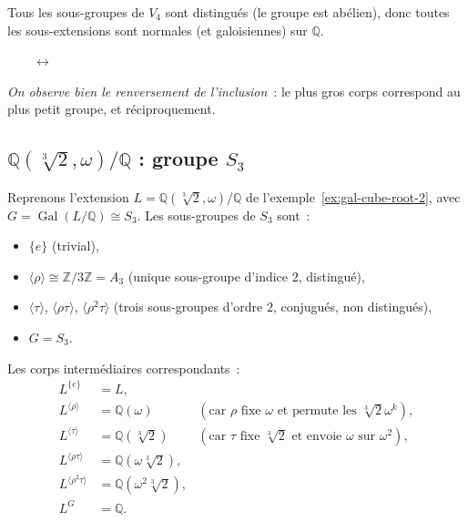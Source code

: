\documentclass[12pt,a4paper,openany]{book}
\theoremstyle{definition}
\newcommand{\Z}{\mathbb{Z}}
\newcommand{\Q}{\mathbb{Q}}
\newcommand{\Gal}{\operatorname{Gal}}
\begin{document}
Tous les sous-groupes de $V_4$ sont distingués (le groupe est abélien), donc
toutes les sous-extensions sont normales (et galoisiennes) sur $\Q$.

\begin{center}
$\qquad\longleftrightarrow\qquad$
\end{center}

\noindent
\emph{On observe bien le renversement de l'inclusion}~: le plus gros corps
correspond au plus petit groupe, et réciproquement.

\subsection{$\Q(\sqrt[3]{2},\omega)/\Q$ : groupe $S_3$}\label{ssec:S3}

Reprenons l'extension $L = \Q(\sqrt[3]{2},\omega)/\Q$ de
l'exemple~\ref{ex:gal-cube-root-2}, avec $G = \Gal(L/\Q) \cong S_3$.
Les sous-groupes de $S_3$ sont~:
\begin{itemize}
  \item $\{e\}$ (trivial),
  \item $\langle\rho\rangle \cong \Z/3\Z = A_3$ (unique sous-groupe d'indice $2$,
    distingué),
  \item $\langle\tau\rangle$, $\langle\rho\tau\rangle$,
    $\langle\rho^2\tau\rangle$ (trois sous-groupes d'ordre $2$, conjugués,
    non distingués),
  \item $G = S_3$.
\end{itemize}

Les corps intermédiaires correspondants~:
\begin{align*}
  L^{\{e\}} &= L, \\
  L^{\langle\rho\rangle} &= \Q(\omega)
    &(\text{car }\rho\text{ fixe }\omega\text{ et permute les }\sqrt[3]{2}\omega^k), \\
  L^{\langle\tau\rangle} &= \Q(\sqrt[3]{2})
    &(\text{car }\tau\text{ fixe }\sqrt[3]{2}\text{ et envoie }\omega
    \text{ sur }\omega^2), \\
  L^{\langle\rho\tau\rangle} &= \Q(\omega\sqrt[3]{2}), \\
  L^{\langle\rho^2\tau\rangle} &= \Q(\omega^2\sqrt[3]{2}), \\
  L^G &= \Q.
\end{align*}
\end{document}
